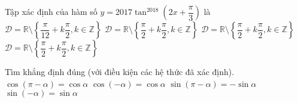 \begin{ex}%
	Tập xác định của hàm số $y=2017\tan^{2018} \left( 2x+\dfrac{\pi}{3}\right)$ là
	\choice
	{\True $\mathscr{D}=\mathbb{R}\setminus\left\lbrace\dfrac{\pi}{12}+k\dfrac{\pi}{2}, k\in\mathbb{Z} \right\rbrace $}
	{$\mathscr{D}=\mathbb{R}\setminus\left\lbrace\dfrac{\pi}{2}+k\dfrac{\pi}{2}, k\in\mathbb{Z} \right\rbrace $}
	{$\mathscr{D}=\mathbb{R}\setminus\left\lbrace\dfrac{\pi}{2}+k\dfrac{\pi}{2}, k\in\mathbb{Z} \right\rbrace $}
	{$\mathscr{D}=\mathbb{R}\setminus\left\lbrace\dfrac{\pi}{2}+k\dfrac{\pi}{2}, k\in\mathbb{Z} \right\rbrace $}
\end{ex}

\begin{ex}%
	Tìm khẳng định đúng (với điều kiện các hệ thức đã xác định).
	\choice
	{$\cos \left(\pi -\alpha \right)=\cos \alpha$}
	{\True $\cos \left(-\alpha \right)=\cos \alpha$}
	{$\sin \left(\pi -\alpha \right)=-\sin \alpha$}
	{$\sin \left(-\alpha \right)=\sin \alpha$}
\end{ex}



